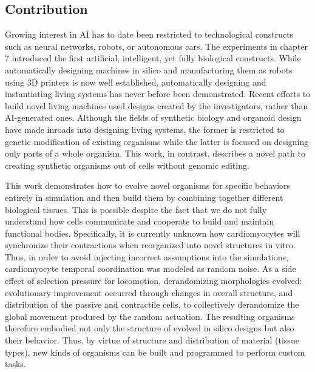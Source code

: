 \subsection{Contribution}

Growing interest in AI has to date been restricted to technological constructs such as neural networks, robots, or autonomous cars. 
The experiments in chapter 7
introduced the first artificial, intelligent, yet fully biological constructs. 
While automatically designing machines in silico and manufacturing them as robots using 3D printers is now well established, automatically designing and instantiating living systems has never before been demonstrated. 
Recent efforts to build novel living machines \cite{herr2004swimming,xi2005self,feinberg2007muscular,cvetkovic2014three,raman2016optogenetic,nawroth2012tissue,park2016phototactic,ricotti2017biohybrid} used designs created by the investigators, rather than AI-generated ones.
Although the fields of synthetic biology and organoid design have made inroads into designing living systems, the former is restricted to genetic modification of existing organisms while the latter is focused on designing only parts of a whole organism.
This work, in contrast, describes a novel path to creating synthetic organisms out of cells without genomic editing.

This work demonstrates how to evolve novel organisms for specific behaviors entirely in simulation and then build them 
by combining together different biological tissues.
This is possible despite the fact that we do not fully understand how cells communicate and cooperate to build and maintain functional bodies.
Specifically,
it is currently unknown how cardiomyocytes will synchronize their contractions when reorganized into novel structures in vitro.
Thus, in order to avoid injecting incorrect assumptions into the simulations,
cardiomyocyte temporal coordination was modeled as random noise.
As a side effect of selection pressure for locomotion, derandomizing morphologies evolved: evolutionary improvement occurred through changes in overall structure, and distribution of the passive and contractile cells, to collectively derandomize the global movement produced by the random actuation. 
The resulting organisms therefore embodied not only the structure of evolved in silico designs but also their behavior.
Thus, by virtue of structure and distribution of material (tissue types), new kinds of organisms can be built and programmed to perform custom tasks.



